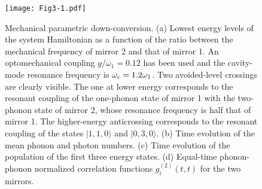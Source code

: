 \documentclass[aps,pra,twocolumn,floatfix,longbibliography, superscriptaddress]{revtex4-1}
\begin{document}
	\begin{figure}[h!]
	\centering
	\texttt{[image: Fig3-1.pdf]} %
	\caption{Mechanical parametric down-conversion. (a) Lowest energy levels of the system Hamiltonian as a function of the ratio between the  mechanical frequency of mirror 2 and that of mirror 1. An optomechanical coupling $g/\omega_{1} = 0.12$ has been used and the cavity-mode resonance frequency is $\omega_{\rm c}  = 1.2\omega_1$. Two avoided-level crossings are clearly visible. The one at lower energy corresponds to
		the resonant coupling of the one-phonon state of mirror 1 with the two-phonon state of mirror 2, whose resonance frequency is half that of mirror 1. The higher-energy anticrossing corresponds to the resonant coupling of the states $|1,1,0 \rangle$ and $|0,3,0 \rangle$. (b) Time evolution of the mean phonon and photon numbers. (c) Time evolution of the population of the first three energy states. (d) Equal-time phonon-phonon normalized correlation functions $g^{(2)}_i(t,t)$ for the two mirrors.
		\label{fig:3}}
\end{figure}
%
%
\end{document}
